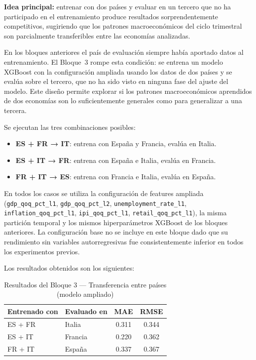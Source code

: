 \textbf{Idea principal:} entrenar con dos países y evaluar en un tercero que no ha
participado en el entrenamiento produce resultados sorprendentemente competitivos,
sugiriendo que los patrones macroeconómicos del ciclo trimestral son parcialmente
transferibles entre las economías analizadas.

En los bloques anteriores el país de evaluación siempre había aportado datos al
entrenamiento. El Bloque~3 rompe esta condición: se entrena un modelo XGBoost con la
configuración ampliada usando los datos de dos países y se evalúa sobre el tercero, que
no ha sido visto en ninguna fase del ajuste del modelo. Este diseño permite explorar si
los patrones macroeconómicos aprendidos de dos economías son lo suficientemente generales
como para generalizar a una tercera.

Se ejecutan las tres combinaciones posibles:

\begin{itemize}
    \item \textbf{ES + FR → IT}: entrena con España y Francia, evalúa en Italia.
    \item \textbf{ES + IT → FR}: entrena con España e Italia, evalúa en Francia.
    \item \textbf{FR + IT → ES}: entrena con Francia e Italia, evalúa en España.
\end{itemize}

En todos los casos se utiliza la configuración de features ampliada
(\texttt{gdp\_qoq\_pct\_l1}, \texttt{gdp\_qoq\_pct\_l2}, \texttt{unemployment\_rate\_l1},
\texttt{inflation\_qoq\_pct\_l1}, \texttt{ipi\_qoq\_pct\_l1}, \texttt{retail\_qoq\_pct\_l1}),
la misma partición temporal y los mismos hiperparámetros XGBoost de los bloques anteriores.
La configuración base no se incluye en este bloque dado que su rendimiento sin variables
autorregresivas fue consistentemente inferior en todos los experimentos previos.

Los resultados obtenidos son los siguientes:

\begin{table}[H]
\centering
\caption{Resultados del Bloque 3 --- Transferencia entre países (modelo ampliado)}
\label{tab:bloque3}
\small
\begin{tabular}{llcc}
\hline
\textbf{Entrenado con} & \textbf{Evaluado en} & \textbf{MAE} & \textbf{RMSE} \\
\hline
ES + FR & Italia  & 0.311 & 0.344 \\
ES + IT & Francia & 0.220 & 0.362 \\
FR + IT & España  & 0.337 & 0.367 \\
\hline
\end{tabular}
\end{table}

